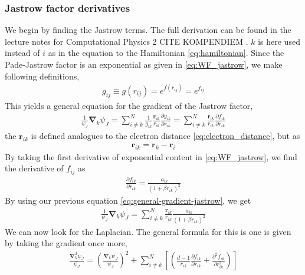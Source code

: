 \documentclass[11pt]{article}
\newcommand{\husk}[1]{\color{red} #1 \color{black}}
\begin{document}
\subsubsection{Jastrow factor derivatives}
We begin by finding the Jastrow terms. The full derivation can be found in the lecture notes for Computational Physics 2 \husk{CITE KOMPENDIEM}. $k$ is here used instead of $i$ as in the equation to the Hamiltonian \eqref{eq:hamiltonian}. Since the Pade-Jastrow factor is an exponential as given in \eqref{eq:WF_jastrow}, we make following definitions,
\begin{align}
	g_{ij} \equiv g(r_{ij}) = e^{f(r_{ij})} = e^{f_{ij}}
	\label{eq:pade-jastrow-eq}
\end{align}
This yields a general equation for the gradient of the Jastrow factor,
\begin{align}
	\frac{1}{\psi_J}\bm{\nabla}_k\psi_J = \sum^{N}_{i\neq k} \frac{1}{g_{ik}} \frac{\mathbf{r}_{ik}}{r_{ik}}\frac{\partial g_{ik}}{\partial r_{ik}} = \sum^N_{i\neq k} \frac{\mathbf{r}_{ik}}{r_{ik}}\frac{\partial f_{ik}}{\partial r_{ik}}
	\label{eq:general-gradient-jastrow}
\end{align}
the $\mathbf{r}_{ik}$ is defined analogues to the electron distance \eqref{eq:electron_distance}, but as
\begin{align}
	\mathbf{r}_{ik} = \mathbf{r}_k - \mathbf{r}_i
	\label{eq:electron-distance-vector}
\end{align}
By taking the first derivative of exponential content in \eqref{eq:WF_jastrow}, we find the derivative of $f_{ij}$ as
\begin{align}
	\frac{\partial f_{ik}}{\partial r_{ik}} = \frac{a_{ik}}{(1+\beta r_{ik})^2}
	\label{eq:jastrow-f-derivative}
\end{align}
By using our previous equation \eqref{eq:general-gradient-jastrow}, we get
\begin{align}
	\frac{1}{\psi_J}\bm{\nabla}_k\psi_J = \sum_{i\neq k}^N \frac{\mathbf{r}_{ik}}{r_{ik}}\frac{a_{ik}}{(1+\beta r_{ik})^2}
	\label{eq:n-body-jastrow-grad}
\end{align}
We can now look for the Laplacian. The general formula for this is one is given by taking the gradient once more,
\begin{align}
	\frac{\bm{\nabla}_k^2\psi_J}{\psi_J} = \left( \frac{\bm{\nabla}_k\psi_J}{\psi_J} \right)^2 + \sum^N_{i\neq k} \left[\left( \frac{d-1}{r_{ik}} \frac{\partial f_{ik}}{\partial r_{ik}} + \frac{\partial^2f_{ik}}{\partial r_{ik}^2} \right)  \right]
	\label{eq:general-laplacian-jastrow}
\end{align}
\end{document}
